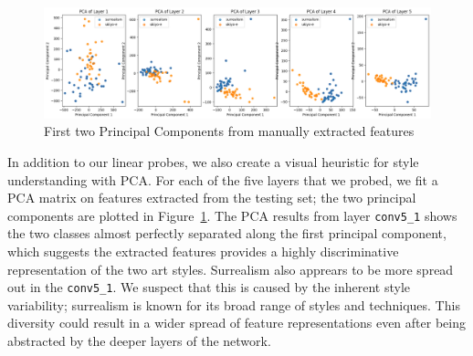 \documentclass[twocolumn]{article}
\begin{document}
\begin{figure}[ht]
    \centering
    \includegraphics[width=1\linewidth]{images/pca_results.png}
    \caption{First two Principal Components from manually extracted features}
    \label{fig:pca_results}
\end{figure}

In addition to our linear probes, we also create a visual heuristic for style understanding with PCA. For each of the five layers that we probed, we fit a PCA matrix on features extracted from the testing set; the two principal components are plotted in Figure~\ref{fig:pca_results}. The PCA results from layer \verb|conv5_1| shows the two classes almost perfectly separated along the first principal component, which suggests the extracted features provides a highly discriminative representation of the two art styles. Surrealism also apprears to be more spread out in the \verb|conv5_1|. We suspect that this is caused by the inherent style variability; surrealism is known for its broad range of styles and techniques. This diversity could result in a wider spread of feature representations even after being abstracted by the deeper layers of the network. 


\end{document}
